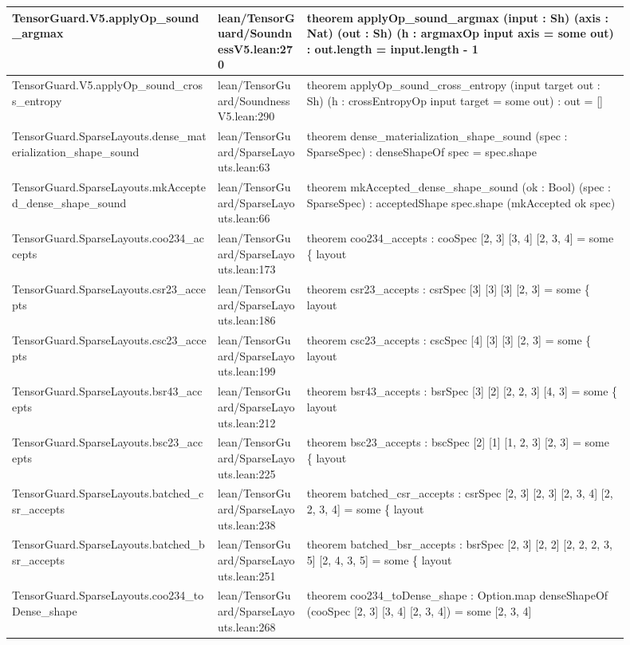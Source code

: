 \documentclass[10pt]{article}
\begin{document}
\begin{longtable}{|p{0.30\linewidth}|p{0.13\linewidth}|p{0.47\linewidth}|}
\hline
TensorGuard.V5.applyOp\_sound\_argmax & lean/TensorGuard/SoundnessV5.lean:270 & theorem applyOp\_sound\_argmax (input : Sh) (axis : Nat) (out : Sh) (h : argmaxOp input axis = some out) : out.length = input.length - 1 \\
\hline
TensorGuard.V5.applyOp\_sound\_cross\_entropy & lean/TensorGuard/SoundnessV5.lean:290 & theorem applyOp\_sound\_cross\_entropy (input target out : Sh) (h : crossEntropyOp input target = some out) : out = [] \\
\hline
TensorGuard.SparseLayouts.dense\_materialization\_shape\_sound & lean/TensorGuard/SparseLayouts.lean:63 & theorem dense\_materialization\_shape\_sound (spec : SparseSpec) : denseShapeOf spec = spec.shape \\
\hline
TensorGuard.SparseLayouts.mkAccepted\_dense\_shape\_sound & lean/TensorGuard/SparseLayouts.lean:66 & theorem mkAccepted\_dense\_shape\_sound (ok : Bool) (spec : SparseSpec) : acceptedShape spec.shape (mkAccepted ok spec) \\
\hline
TensorGuard.SparseLayouts.coo234\_accepts & lean/TensorGuard/SparseLayouts.lean:173 & theorem coo234\_accepts : cooSpec [2, 3] [3, 4] [2, 3, 4] = some \{ layout \\
\hline
TensorGuard.SparseLayouts.csr23\_accepts & lean/TensorGuard/SparseLayouts.lean:186 & theorem csr23\_accepts : csrSpec [3] [3] [3] [2, 3] = some \{ layout \\
\hline
TensorGuard.SparseLayouts.csc23\_accepts & lean/TensorGuard/SparseLayouts.lean:199 & theorem csc23\_accepts : cscSpec [4] [3] [3] [2, 3] = some \{ layout \\
\hline
TensorGuard.SparseLayouts.bsr43\_accepts & lean/TensorGuard/SparseLayouts.lean:212 & theorem bsr43\_accepts : bsrSpec [3] [2] [2, 2, 3] [4, 3] = some \{ layout \\
\hline
TensorGuard.SparseLayouts.bsc23\_accepts & lean/TensorGuard/SparseLayouts.lean:225 & theorem bsc23\_accepts : bscSpec [2] [1] [1, 2, 3] [2, 3] = some \{ layout \\
\hline
TensorGuard.SparseLayouts.batched\_csr\_accepts & lean/TensorGuard/SparseLayouts.lean:238 & theorem batched\_csr\_accepts : csrSpec [2, 3] [2, 3] [2, 3, 4] [2, 2, 3, 4] = some \{ layout \\
\hline
TensorGuard.SparseLayouts.batched\_bsr\_accepts & lean/TensorGuard/SparseLayouts.lean:251 & theorem batched\_bsr\_accepts : bsrSpec [2, 3] [2, 2] [2, 2, 2, 3, 5] [2, 4, 3, 5] = some \{ layout \\
\hline
TensorGuard.SparseLayouts.coo234\_toDense\_shape & lean/TensorGuard/SparseLayouts.lean:268 & theorem coo234\_toDense\_shape : Option.map denseShapeOf (cooSpec [2, 3] [3, 4] [2, 3, 4]) = some [2, 3, 4] \\

\end{longtable}
\end{document}
